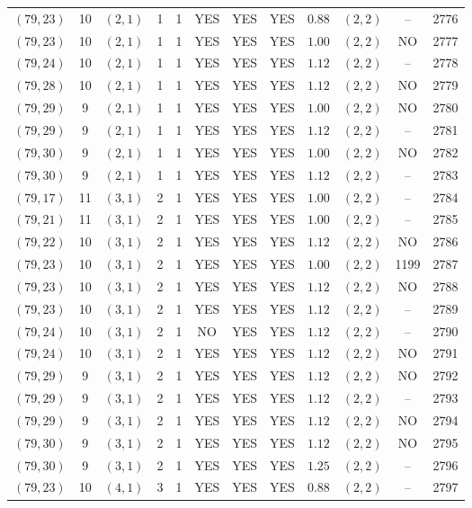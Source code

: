 \begin{longtable}{|c|c|c|c|c|c|c|c|c|c|c|c|}
$(79,23)$ & 10 & $(2,1)$ & 1 & 1 & YES & YES & YES & $0.88$ & $(2,2)$ & -- & 2776\\
$(79,23)$ & 10 & $(2,1)$ & 1 & 1 & YES & YES & YES & $1.00$ & $(2,2)$ & NO & 2777\\
$(79,24)$ & 10 & $(2,1)$ & 1 & 1 & YES & YES & YES & $1.12$ & $(2,2)$ & -- & 2778\\
$(79,28)$ & 10 & $(2,1)$ & 1 & 1 & YES & YES & YES & $1.12$ & $(2,2)$ & NO & 2779\\
$(79,29)$ & 9 & $(2,1)$ & 1 & 1 & YES & YES & YES & $1.00$ & $(2,2)$ & NO & 2780\\
$(79,29)$ & 9 & $(2,1)$ & 1 & 1 & YES & YES & YES & $1.12$ & $(2,2)$ & -- & 2781\\
$(79,30)$ & 9 & $(2,1)$ & 1 & 1 & YES & YES & YES & $1.00$ & $(2,2)$ & NO & 2782\\
$(79,30)$ & 9 & $(2,1)$ & 1 & 1 & YES & YES & YES & $1.12$ & $(2,2)$ & -- & 2783\\
$(79,17)$ & 11 & $(3,1)$ & 2 & 1 & YES & YES & YES & $1.00$ & $(2,2)$ & -- & 2784\\
$(79,21)$ & 11 & $(3,1)$ & 2 & 1 & YES & YES & YES & $1.00$ & $(2,2)$ & -- & 2785\\
$(79,22)$ & 10 & $(3,1)$ & 2 & 1 & YES & YES & YES & $1.12$ & $(2,2)$ & NO & 2786\\
$(79,23)$ & 10 & $(3,1)$ & 2 & 1 & YES & YES & YES & $1.00$ & $(2,2)$ & 1199 & 2787\\
$(79,23)$ & 10 & $(3,1)$ & 2 & 1 & YES & YES & YES & $1.12$ & $(2,2)$ & NO & 2788\\
$(79,23)$ & 10 & $(3,1)$ & 2 & 1 & YES & YES & YES & $1.12$ & $(2,2)$ & -- & 2789\\
$(79,24)$ & 10 & $(3,1)$ & 2 & 1 & NO & YES & YES & $1.12$ & $(2,2)$ & -- & 2790\\
$(79,24)$ & 10 & $(3,1)$ & 2 & 1 & YES & YES & YES & $1.12$ & $(2,2)$ & NO & 2791\\
$(79,29)$ & 9 & $(3,1)$ & 2 & 1 & YES & YES & YES & $1.12$ & $(2,2)$ & NO & 2792\\
$(79,29)$ & 9 & $(3,1)$ & 2 & 1 & YES & YES & YES & $1.12$ & $(2,2)$ & -- & 2793\\
$(79,29)$ & 9 & $(3,1)$ & 2 & 1 & YES & YES & YES & $1.12$ & $(2,2)$ & NO & 2794\\
$(79,30)$ & 9 & $(3,1)$ & 2 & 1 & YES & YES & YES & $1.12$ & $(2,2)$ & NO & 2795\\
$(79,30)$ & 9 & $(3,1)$ & 2 & 1 & YES & YES & YES & $1.25$ & $(2,2)$ & -- & 2796\\
$(79,23)$ & 10 & $(4,1)$ & 3 & 1 & YES & YES & YES & $0.88$ & $(2,2)$ & -- & 2797\\

\end{longtable}
